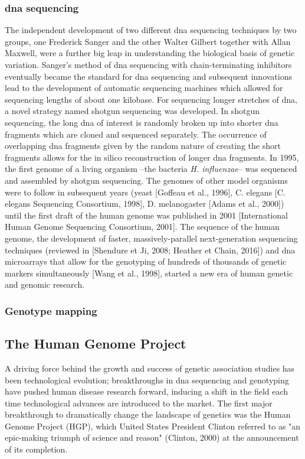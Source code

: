 \subsubsection{\gls{dna} sequencing}
The independent development of two different \gls{dna} sequencing techniques by two groups, one Frederick Sanger and the other Walter Gilbert together with Allan Maxwell, were a further big leap in understanding the biological basis of genetic variation. 
Sanger’s method of \gls{dna} sequencing with chain-terminating inhibitors eventually became the standard for \gls{dna} sequencing and subsequent innovations lead to the development of automatic sequencing machines which allowed for sequencing lengths of about one kilobase. 
For sequencing longer stretches of \gls{dna}, a novel strategy named shotgun sequencing was developed. 
In shotgun sequencing, the long \gls{dna} of interest is randomly broken up into shorter \gls{dna} fragments which are cloned and sequenced separately. 
The occurrence of overlapping \gls{dna} fragments given by the random nature of creating the short fragments allows for the in silico reconstruction of longer \gls{dna} fragments.
In 1995, the first genome of a living organism –the bacteria \textit{H. influenzae}– was sequenced and assembled by shotgun sequencing. 
The genomes of other model organisms were to follow in subsequent years (yeast [Goffeau et al., 1996], C. elegans [C. elegans Sequencing Consortium, 1998], D. melanogaster [Adams et al., 2000]) until the first draft of the human genome was published in 2001 [International Human Genome Sequencing Consortium, 2001].
The sequence of the human genome, the development of faster, massively-parallel next-generation sequencing techniques (reviewed in [Shendure et Ji, 2008; Heather et Chain, 2016]) and \gls{dna} microarrays that allow for the genotyping of hundreds of thousands of genetic markers simultaneously [Wang et al., 1998], started a new era of human genetic and genomic research.


\subsubsection{Genotype mapping}

\subsection{The Human Genome Project}

A driving force behind the growth and success of genetic association studies has been technological evolution; breakthroughs in \gls{dna} sequencing and genotyping have pushed human disease research forward, inducing a shift in the field each time technological
advances are introduced to the market. 
The first major breakthrough to dramatically change the landscape of genetics was the Human Genome Project (HGP), which United States President Clinton referred to as "an epic-making triumph of science and reason" (Clinton, 2000) at the announcement of its completion.\\

